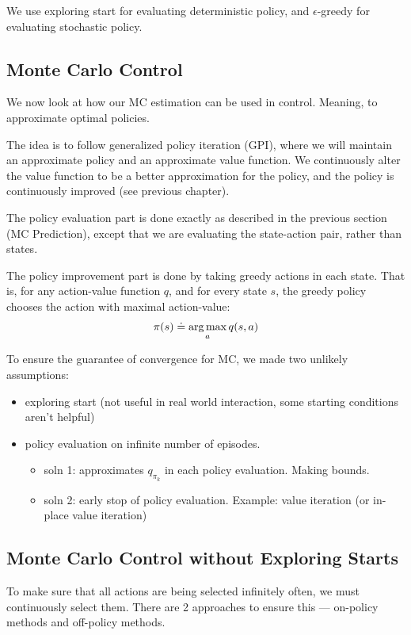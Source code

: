 \documentclass[sutton_barto_notes.tex]{subfiles}
\begin{document}
We use exploring start for evaluating deterministic policy, and $\epsilon$-greedy for evaluating stochastic policy.

\subsection{Monte Carlo Control}

We now look at how our MC estimation can be used in control. Meaning, to approximate optimal policies.

The idea is to follow generalized policy iteration (GPI), where we will maintain an approximate policy and an approximate value function.
We continuously alter the value function to be a better approximation for the policy, and the policy is continuously improved (see previous chapter).


The policy evaluation part is done exactly as described in the previous section (MC Prediction), except that we are evaluating the state-action pair, rather than states.

The policy improvement part is done by taking greedy actions in each state. That is, for any action-value function $q$, and for every state $s$, the greedy policy chooses the action with maximal action-value:
$$ \pi(s) \doteq \operatorname*{arg\,max}_a q(s,a) $$

To ensure the guarantee of convergence for MC, we made two unlikely assumptions:
\begin{itemize}
\item exploring start (not useful in real world interaction, some starting conditions aren't helpful)
\item policy evaluation on infinite number of episodes.
\begin{itemize}
	\item soln 1: approximates $q_{\pi_k}$ in each policy evaluation. Making bounds.
	\item soln 2: early stop of policy evaluation. Example: value iteration (or in-place value iteration)
\end{itemize}
\end{itemize}

\subsection{Monte Carlo Control without Exploring Starts}

To make sure that all actions are being selected infinitely often, we must continuously select them.
There are 2 approaches to ensure this — on-policy methods and off-policy methods.
\end{document}
